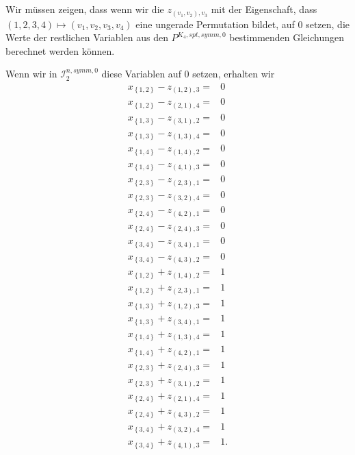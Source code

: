 \documentclass[10p,a4paper,BCOR = 12mm, DIV=15]{scrbook}
\begin{document}
\begin{bew}
Wir müssen zeigen, dass wenn wir die $z_{\left(v_1, v_2\right), v_3}$ mit der Eigenschaft, dass $\left(1, 2, 3, 4\right) \mapsto \left(v_1, v_2, v_3, v_4\right)$ eine ungerade Permutation bildet, auf 0 setzen, die Werte der restlichen Variablen aus den $P^{K_4, spt, symm, 0}$ bestimmenden Gleichungen berechnet werden können.

Wenn wir in $\mathcal{I}^{n, symm, 0}_2$ diese Variablen auf $0$ setzen, erhalten wir
{
\allowdisplaybreaks
\begin{align*}
x_{\left\{1, 2\right\}} - z_{\left(1, 2\right), 3} = & 0 \\
x_{\left\{1, 2\right\}} - z_{\left(2, 1\right), 4} = & 0 \\
x_{\left\{1, 3\right\}} - z_{\left(3, 1\right), 2} = & 0 \\
x_{\left\{1, 3\right\}} - z_{\left(1, 3\right), 4} = & 0 \\
x_{\left\{1, 4\right\}} - z_{\left(1, 4\right), 2} = & 0 \\
x_{\left\{1, 4\right\}} - z_{\left(4, 1\right), 3} = & 0 \\
x_{\left\{2, 3\right\}} - z_{\left(2, 3\right), 1} = & 0 \\
x_{\left\{2, 3\right\}} - z_{\left(3, 2\right), 4} = & 0 \\
x_{\left\{2, 4\right\}} - z_{\left(4, 2\right), 1} = & 0 \\
x_{\left\{2, 4\right\}} - z_{\left(2, 4\right), 3} = & 0 \\
x_{\left\{3, 4\right\}} - z_{\left(3, 4\right), 1} = & 0 \\
x_{\left\{3, 4\right\}} - z_{\left(4, 3\right), 2} = & 0 \\
x_{\left\{1, 2\right\}} + z_{\left(1, 4\right), 2} = & 1 \\
x_{\left\{1, 2\right\}} + z_{\left(2, 3\right), 1} = & 1 \\
x_{\left\{1, 3\right\}} + z_{\left(1, 2\right), 3} = & 1 \\
x_{\left\{1, 3\right\}} + z_{\left(3, 4\right), 1} = & 1 \\
x_{\left\{1, 4\right\}} + z_{\left(1, 3\right), 4} = & 1 \\
x_{\left\{1, 4\right\}} + z_{\left(4, 2\right), 1} = & 1 \\
x_{\left\{2, 3\right\}} + z_{\left(2, 4\right), 3} = & 1 \\
x_{\left\{2, 3\right\}} + z_{\left(3, 1\right), 2} = & 1 \\
x_{\left\{2, 4\right\}} + z_{\left(2, 1\right), 4} = & 1 \\
x_{\left\{2, 4\right\}} + z_{\left(4, 3\right), 2} = & 1 \\
x_{\left\{3, 4\right\}} + z_{\left(3, 2\right), 4} = & 1 \\
x_{\left\{3, 4\right\}} + z_{\left(4, 1\right), 3} = & 1.
\end{align*}
}


\end{bew}
\end{document}
